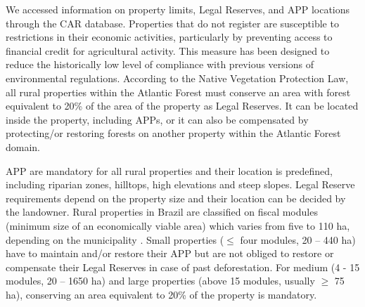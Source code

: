 \documentclass[
	12pt,				%
	oneside,			%
	a4paper,			%
	chapter=TITLE,		%
	section=TITLE,		%
	brazil,			%
	english				%
	]{abntex2}
\begin{document}
We accessed information on property limits, Legal Reserves, and APP locations through the CAR database. Properties that do not register are susceptible to restrictions in their economic activities, particularly by preventing access to financial credit for agricultural activity. This measure has been designed to reduce the historically low level of compliance with previous versions of environmental regulations. According to the Native Vegetation Protection Law, all rural properties within the Atlantic Forest must conserve an area with forest equivalent to 20\% of the area of the property as Legal Reserves. It can be located inside the property, including APPs, or it can also be compensated by protecting/or restoring forests on another property within the Atlantic Forest domain.

APP are mandatory for all rural properties and their location is predefined, including riparian zones, hilltops, high elevations and steep slopes. Legal Reserve requirements depend on the property size and their location can be decided by the landowner. Rural properties in Brazil are classified on fiscal modules (minimum size of an economically viable area) which varies from five to 110 ha, depending on the municipality \autocite{brancalion_critical_2016}. Small properties (\(\le\) four modules, 20 -- 440 ha) have to maintain and/or restore their APP but are not obliged to restore or compensate their Legal Reserves in case of past deforestation. For medium (4 - 15 modules, 20 -- 1650 ha) and large properties (above 15 modules, usually \(\ge\) 75 ha), conserving an area equivalent to 20\% of the property is mandatory.
\end{document}
